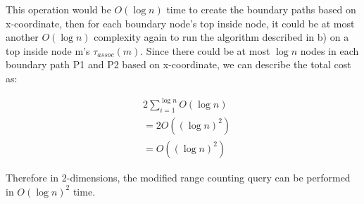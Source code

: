 \documentclass[12pt]{article}
\begin{document}
\begin{enumerate}
This operation would be $O(\log n)$ time to create the boundary paths based on x-coordinate, then for each boundary node's top inside node, it could be at most another $O(\log n)$ complexity again to run the algorithm described in b) on a top inside node m's $\tau_{assoc}(m)$. Since there could be at most $\log n$ nodes in each boundary path P1 and P2 based on x-coordinate, we can describe the total cost as:

\begin{align*}
  &2\sum_{i=1}^{\log n} O(\log n)\\
  &=2O((\log n)^2)\\
  &=O((\log n)^2)
\end{align*}

Therefore in 2-dimensions, the modified range counting query can be performed in $O(\log{n})^2$ time.
\end{enumerate}

\end{document}
